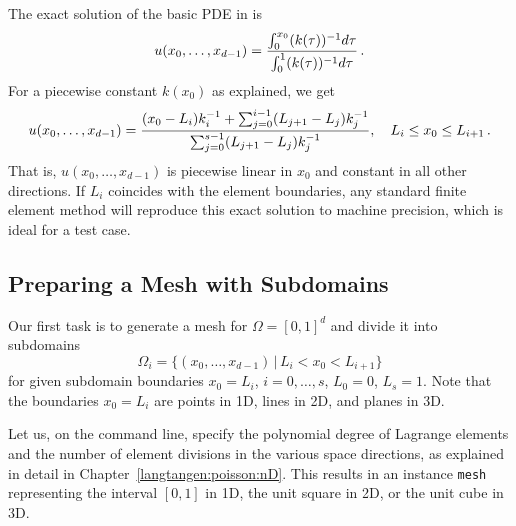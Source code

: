 The exact solution of the basic PDE in  is
\[ u(x_0,\ldots,x_{d-1}) = 
{\int_0^{x_0} (k(\tau ))^{-1}d\tau\over \int_0^1 (k(\tau ))^{-1}d\tau}\thinspace .
\]
For a piecewise constant $k(x_0)$ as explained, we get
\begin{equation} 
u(x_0,\ldots,x_{d-1}) = 
{(x_0-L_i)k_i^{-1} + \sum_{j=0}^{i-1} (L_{j+1}-L_j)k_j^{-1}\over 
\sum_{j=0}^{s-1} (L_{j+1}-L_j)k_j^{-1}},\quad L_i\leq x_0 \leq L_{i+1}\thinspace .
\label{langtangen:poisson:2D:varcoeff2:exact}
\end{equation}
That is, $u(x_0,\ldots,x_{d-1})$ is piecewise linear in $x_0$ and
constant in all other directions.
If $L_i$
coincides with the element boundaries, any standard finite element method
will reproduce this exact solution to machine precision, which is ideal
for a test case.




\subsection{Preparing a Mesh with Subdomains}
\label{langtangen:possion:nD:nmat:prepro}

Our first task is to generate a mesh for $\Omega = [0,1]^d$ and divide
it into subdomains
\[ \Omega_i = \{ (x_0,\ldots,x_{d-1})\, |\, L_i<x_0<L_{i+1}\}\]
for given subdomain boundaries $x_0=L_i$, $i=0,\ldots,s$, $L_0=0$, $L_s=1$.
Note that the boundaries $x_0=L_i$ are points in 1D, lines in 2D, and
planes in 3D.

Let us, on the command line, specify the polynomial degree of Lagrange
elements and the number of element divisions in the various space
directions, as explained in detail in
Chapter~\ref{langtangen:poisson:nD}. This results in an instance {\fontsize{12pt}{12pt}\texttt{mesh}}
representing the interval $[0,1]$ in 1D, the unit square in 2D, or the
unit cube in 3D.


